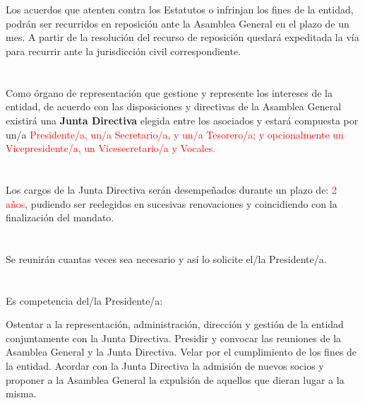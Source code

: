 \documentclass[draft]{estatutos}
\begin{document}
\begin{linenumbers}[1]
  \section{}
  Los acuerdos que atenten contra los Estatutos o infrinjan los fines de la
  entidad, podrán ser recurridos en reposición ante la Asamblea General en el
  plazo de un mes. A partir de la resolución del recurso de reposición quedará
  expeditada la vía para recurrir ante la jurisdicción civil correspondiente.

  \section{}
  \label{sec:junta-directiva}
  Como órgano de representación que gestione y represente los intereses de la
  entidad, de acuerdo con las disposiciones y directivas de la Asamblea General
  existirá una \textbf{Junta Directiva} elegida entre los asociados y estará
  compuesta por un/a \textcolor{red}{Presidente/a, un/a Secretario/a, y un/a Tesorero/a; y
  opcionalmente un Vicepresidente/a, un Vicesecretario/a y Vocales.}

  \section{}
  Los cargos de la Junta Directiva serán desempeñados durante un plazo de:
  \textcolor{red}{2 años}, pudiendo ser reelegidos en sucesivas
  renovaciones y coincidiendo con la finalización del mandato.

  \section{}
  Se reunirán cuantas veces sea necesario y así lo solicite el/la Presidente/a.

  \section{}
  Es competencia del/la Presidente/a:

  \begin{enumerate}
  \sub Ostentar a la representación, administración, dirección y gestión de la
      entidad conjuntamente con la Junta Directiva.
  \sub Presidir y convocar las reuniones de la Asamblea General y la Junta
      Directiva.
  \sub Velar por el cumplimiento de los fines de la entidad.
  \sub Acordar con la Junta Directiva la admisión de nuevos socios y proponer a
      la Asamblea General la expulsión de aquellos que dieran lugar a la misma.
  \end{enumerate}
         

\end{linenumbers}
\end{document}
